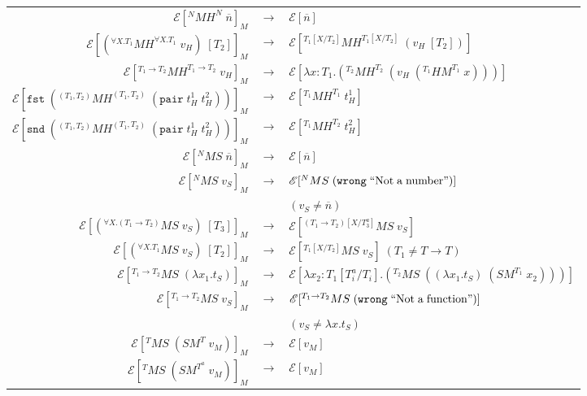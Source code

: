 \begin{figure}
\onehalfspacing
\begin{center}
\begin{tabular}{rcl}
$\mathscr{E}[^{N}MH^{N}\;\overline{n}]_{M}$ & $\rightarrow$ & $\mathscr{E}[\overline{n}]$ \\
$\mathscr{E}[(^{\forall X.T_{1}}MH^{\forall X.T_{1}}\;v_{H})\;[T_{2}]]_{M}$ & $\rightarrow$ & $\mathscr{E}[^{T_{1}[X/T_{2}]}MH^{T_{1}[X/T_{2}]}\;(v_{H}\;[T_{2}])]$ \\
$\mathscr{E}[^{T_{1}\rightarrow T_{2}}MH^{T_{1}\rightarrow T_{2}}\;v_{H}]_{M}$ & $\rightarrow$ & $\mathscr{E}[\lambda x:T_{1}.(^{T_{2}}MH^{T_{2}}\;(v_{H}\;(^{T_{1}}HM^{T_{1}}\;x)))]$ \\
$\mathscr{E}[\mathtt{fst}\;(^{(T_{1},T_{2})}MH^{(T_{1},T_{2})}\;(\mathtt{pair}\;t_{H}^{1}\;t_{H}^{2}))]_{M}$ & $\rightarrow$ & $\mathscr{E}[^{T_{1}}MH^{T_{1}}\;t_{H}^{1}]$ \\
$\mathscr{E}[\mathtt{snd}\;(^{(T_{1},T_{2})}MH^{(T_{1},T_{2})}\;(\mathtt{pair}\;t_{H}^{1}\;t_{H}^{2}))]_{M}$ & $\rightarrow$ & $\mathscr{E}[^{T_{1}}MH^{T_{2}}\;t_{H}^{2}]$ \\
$\mathscr{E}[^{N}MS\;\overline{n}]_{M}$ & $\rightarrow$ & $\mathscr{E}[\overline{n}]$ \\
$\mathscr{E}[^{N}MS\;v_{S}]_{M}$ & $\rightarrow$ & $\mathscr{E}[^{N}MS\;(\mathtt{wrong}\;\mathrm{``Not\;a\;number"})]$ \\
&& $(v_{S}\neq\overline{n})$ \\
$\mathscr{E}[(^{\forall X.(T_{1}\rightarrow T_{2})}MS\;v_{S})\;[T_{3}]]_{M}$ & $\rightarrow$ & $\mathscr{E}[^{(T_{1}\rightarrow T_{2})[X/T^{a}_{3}]}MS\;v_{S}]$ \\
$\mathscr{E}[(^{\forall X.T_{1}}MS\;v_{S})\;[T_{2}]]_{M}$ & $\rightarrow$ & $\mathscr{E}[^{T_{1}[X/T_{2}]}MS\;v_{S}]\;(T_{1}\neq T\rightarrow T)$ \\
$\mathscr{E}[^{T_{1}\rightarrow T_{2}}MS\;(\lambda x_{1}.t_{S})]_{M}$ & $\rightarrow$ & $\mathscr{E}[\lambda x_{2}:T_{1}[T^{a}_{i}/T_{i}].(^{T_{2}}MS\;((\lambda x_{1}.t_{S})\;(SM^{T_{1}}\;x_{2})))]$ \\
$\mathscr{E}[^{T_{1}\rightarrow T_{2}}MS\;v_{S}]_{M}$ & $\rightarrow$ & $\mathscr{E}[^{T_{1}\rightarrow T_{2}}MS\;(\mathtt{wrong}\;\mathrm{``Not\;a\;function"})]$ \\
&& $(v_{S}\neq\lambda x.t_{S})$ \\
$\mathscr{E}[^{T}MS\;(SM^{T}\;v_{M})]_{M}$ & $\rightarrow$ & $\mathscr{E}[v_{M}]$ \\
$\mathscr{E}[^{T}MS\;(SM^{T^{a}}\;v_{M})]_{M}$ & $\rightarrow$ & $\mathscr{E}[v_{M}]$ \\

\end{tabular}
\end{center}
\end{figure}
